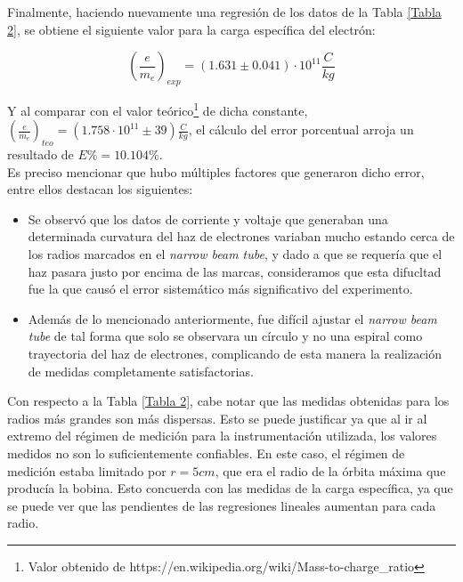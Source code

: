 \documentclass[prb,aps,twocolumn,preprintnumbers,amsmath,amssymb]{revtex4}
\begin{document}
Finalmente, haciendo nuevamente una regresión de los datos de la Tabla \ref{Tabla 2}, se obtiene el siguiente valor para la carga específica del electrón:

\begin{equation}
\left( \frac{e}{m_{e}} \right)_{exp} = (1.631 \pm 0.041) \cdot 10^{11} \frac{C}{kg} 
\end{equation}

Y al comparar con el valor teórico\footnote{Valor obtenido de https://en.wikipedia.org/wiki/Mass-to-charge\_ratio} de dicha constante, $\left( \frac{e}{m_{e}} \right)_{teo} = (1.758 \cdot 10^{11}  \pm 39)  \frac{C}{kg}$, el cálculo del error porcentual arroja un resultado de $E\% = 10.104\%$.\\

Es preciso mencionar que hubo múltiples factores que generaron dicho error, entre ellos destacan los siguientes:

\begin{itemize}
	\item Se observó que los datos de corriente y voltaje que generaban una determinada curvatura del haz de electrones variaban mucho estando cerca de los radios marcados en el \textit{narrow beam tube}, y dado a que se requería que el haz pasara justo por encima de las marcas, consideramos que esta difucltad fue la que causó el error sistemático más significativo del experimento.
	
	\item Además de lo mencionado anteriormente, fue difícil ajustar el \textit{narrow beam tube} de tal forma que solo se observara un círculo y no una espiral como trayectoria del haz de electrones, complicando de esta manera la realización de medidas completamente satisfactorias.
\end{itemize}
	
Con respecto a la Tabla \ref{Tabla 2}, cabe notar que  las medidas obtenidas para los radios más grandes son más dispersas. Esto se puede justificar ya que al ir al extremo del régimen de medición para la instrumentación utilizada, los valores medidos no son lo suficientemente confiables. En este caso, el régimen de medición estaba limitado por $r = 5cm$, que era el radio de la órbita máxima que producía la bobina. Esto concuerda con las medidas de la carga específica, ya que se puede ver que las pendientes de las regresiones lineales aumentan para cada radio. \\
\end{document}
